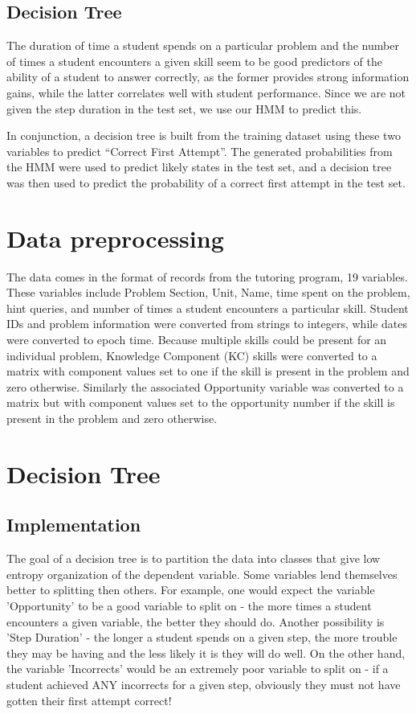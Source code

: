 \documentclass{article} %
\begin{document}
\subsection{Decision Tree}









The duration of time a student spends on a particular problem and the number of times a student encounters a given skill seem to be good predictors of the ability of a student to answer correctly, as the former provides strong information gains, while the latter correlates well with student performance. Since we are not given the step duration in the test set, we use our HMM to predict this.

In conjunction, a decision tree is built from the training dataset using these two variables to predict “Correct First Attempt”. The generated probabilities from the HMM were used to predict likely states in the test set, and a decision tree was then used to predict the probability of a correct first attempt in the test set.


\section{Data preprocessing}
The data comes in the format of records from the tutoring program, 19 variables. These variables include Problem Section, Unit, Name, time spent on the problem, hint queries, and number of times a student encounters a particular skill. Student IDs and problem information were converted from strings to integers, while dates were converted to epoch time. Because multiple skills could be present for an individual problem, Knowledge Component (KC) skills were converted to a matrix with component values set to one if the skill is present in the problem and zero otherwise. Similarly the associated Opportunity variable was converted to a matrix but with component values set to the opportunity number if the skill is present in the problem and zero otherwise.

\section{Decision Tree}
\subsection{Implementation}
The goal of a decision tree is to partition the data into classes that give low entropy organization of the dependent variable. Some variables lend themselves better to splitting then others. For example, one would expect the variable 'Opportunity' to be a good variable to split on - the more times a student encounters a given variable, the better they should do. Another possibility is 'Step Duration' - the longer a student spends on a given step, the more trouble they may be having and the less likely it is they will do well. On the other hand, the variable 'Incorrects' would be an extremely poor variable to split on - if a student achieved ANY incorrects for a given step, obviously they must not have gotten their first attempt correct!
\end{document}
